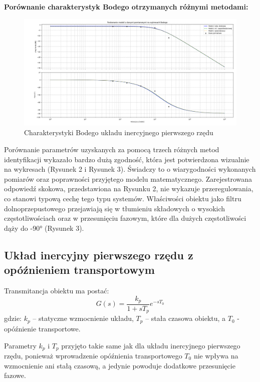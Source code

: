 \documentclass[12pt,a4paper]{article}
\begin{document}
	\textbf{Porównanie charakterystyk Bodego otrzymanych różnymi metodami:}
	\begin{figure}[H]
		\centering
		\includegraphics[width=1\linewidth]{zdjecia/Body1.png}
		\caption{Charakterystyki Bodego układu inercyjnego pierwszego rzędu}
		\label{fig:Body1}
	\end{figure}
	
	Porównanie parametrów uzyskanych za pomocą trzech różnych metod identyfikacji wykazało bardzo dużą zgodność, która jest potwierdzona wizualnie na wykresach (Rysunek 2 i Rysunek 3). Świadczy to o wiarygodności wykonanych pomiarów oraz poprawności przyjętego modelu matematycznego. Zarejestrowana odpowiedź skokowa, przedstawiona na Rysunku 2, nie wykazuje przeregulowania, co stanowi typową cechę tego typu systemów. Właściwości obiektu jako filtru dolnoprzepustowego przejawiają się w tłumieniu składowych o wysokich częstotliwościach oraz w przesunięciu fazowym, które dla dużych częstotliwości dąży do -90° (Rysunek 3).
	
	\subsection{Układ inercyjny pierwszego rzędu z opóźnieniem transportowym}
	Transmitancja obiektu ma postać:
	\begin{equation}
		G(s) = \frac{k_p}{1 + sT_p} e^{-sT_0}
	\end{equation}
	gdzie: \(k_p\) – statyczne wzmocnienie układu, \(T_p\) – stała czasowa obiektu, a \(T_0\) - opóźnienie transportowe.
	
	Parametry $k_p$ i $T_p$ przyjęto takie same jak dla układu inercyjnego pierwszego rzędu, ponieważ wprowadzenie opóźnienia transportowego $T_0$ nie wpływa na wzmocnienie ani stałą czasową, a jedynie powoduje dodatkowe przesunięcie fazowe.
	
\end{document}
